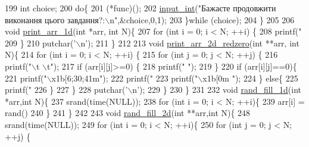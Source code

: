 \begin{DoxyCodeInclude}
{199     \textcolor{keywordtype}{int} choice;
200     \textcolor{keywordflow}{do}\{
201         (*func)();
202         \hyperlink{main_8c_a6f453bc035d85e967bd5032eca31a155}{input\_int}(\textcolor{stringliteral}{"Бажаєте продовжити виконання цього завдання?:\(\backslash\)n"},&choice,0,1);
203     \}\textcolor{keywordflow}{while} (choice);
204 \}
205 
206 \textcolor{keywordtype}{void} \hyperlink{main_8c_afa0f71f47bb3b8336377d2c3972613ff}{print\_arr\_1d}(\textcolor{keywordtype}{int} *arr, \textcolor{keywordtype}{int} N)\{
207     \textcolor{keywordflow}{for} (\textcolor{keywordtype}{int} i = 0; i < N; ++i) \{
208         printf(\textcolor{stringliteral}{"%
209     \}
210     putchar(\textcolor{charliteral}{'\(\backslash\)n'});
211 \}
212 
213 \textcolor{keywordtype}{void} \hyperlink{main_8c_a48d1fca4591b9e83a3cbc3bce60598ee}{print\_arr\_2d\_redzero}(\textcolor{keywordtype}{int} **arr, \textcolor{keywordtype}{int} N)\{
214     \textcolor{keywordflow}{for} (\textcolor{keywordtype}{int} i = 0; i < N; ++i) \{
215         \textcolor{keywordflow}{for} (\textcolor{keywordtype}{int} j = 0; j < N; ++j) \{
216             printf(\textcolor{stringliteral}{"\(\backslash\)t \(\backslash\)t"});
217             \textcolor{keywordflow}{if} (arr[i][j]>=0) \{
218                 printf(\textcolor{stringliteral}{" "});
219             \}
220             \textcolor{keywordflow}{if} (arr[i][j]==0)\{
221                 printf(\textcolor{stringliteral}{"\(\backslash\)x1b[6;30;41m"});
222                 printf(\textcolor{stringliteral}{"%
223                 printf(\textcolor{stringliteral}{"\(\backslash\)x1b[0m "});
224             \} \textcolor{keywordflow}{else}\{
225                 printf(\textcolor{stringliteral}{"%
226             \}
227         \}
228         putchar(\textcolor{charliteral}{'\(\backslash\)n'});
229     \}
230 \}
231 
232 \textcolor{keywordtype}{void} \hyperlink{main_8c_a59de3507f445b58bf9f31f121f1dd53e}{rand\_fill\_1d}(\textcolor{keywordtype}{int} *arr,\textcolor{keywordtype}{int} N)\{
237     srand(time(NULL));
238     \textcolor{keywordflow}{for} (\textcolor{keywordtype}{int} i = 0; i < N; ++i)\{
239         arr[i] = rand()%
240     \}
241 \}
242 
243 \textcolor{keywordtype}{void} \hyperlink{main_8c_a3dd7ddf4e8efd6ad27441f244b6ac232}{rand\_fill\_2d}(\textcolor{keywordtype}{int} **arr,\textcolor{keywordtype}{int} N)\{
248     srand(time(NULL));
249     \textcolor{keywordflow}{for} (\textcolor{keywordtype}{int} i = 0; i < N; ++i)\{
250         \textcolor{keywordflow}{for} (\textcolor{keywordtype}{int} j = 0; j < N; ++j) \{
}}}}
\end{DoxyCodeInclude}
